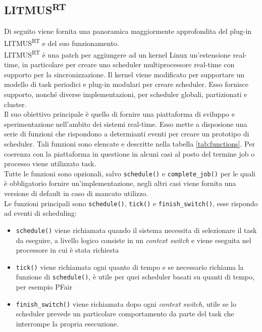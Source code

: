 \begin{appendices}

\section{LITMUS\textsuperscript{RT}}
\label{sec:litmus}

\noindent Di seguito viene fornita una panoramica maggiormente approfondita del plug-in LITMUS\textsuperscript{RT} e del suo funzionamento.\\

\noindent LITMUS\textsuperscript{RT} è una patch per aggiungere ad un kernel Linux un'estensione real-time, in particolare per creare uno scheduler multiprocessore real-time con supporto per la sincronizzazione. Il kernel viene modificato per supportare un modello di task periodici e plug-in modulari per creare scheduler. Esso fornisce supporto, nonché diverse implementazioni, per scheduler globali, partizionati e cluster.\\

\noindent Il suo obiettivo principale è quello di fornire una piattaforma di sviluppo e sperimentazione nell'ambito dei sistemi real-time. Esso mette a disposione una serie di funzioni che rispondono a determianti eventi per creare un prototipo di scheduler. Tali funzioni sono elencate e descritte nella tabella \ref{tab:functions}. Per coerenza con la piattaforma in questione in alcuni casi al posto del termine job o processo viene utilizzato task.\\

\noindent Tutte le funzioni sono opzionali, salvo \texttt{schedule()} e \texttt{complete\_job()} per le quali è obbligatorio fornire un'implementazione, negli altri casi viene fornita una versione di default in caso di mancato utilizzo.\\

\noindent Le funzioni principali sono \texttt{schedule()}, \texttt{tick()} e \texttt{finish\_switch()}, esse rispondo ad eventi di scheduling:\\

\begin{itemize}
	\item \texttt{schedule()} viene richiamata quando il sistema necessita di selezionare il task da eseguire, a livello logico consiste in un \textit{context switch} e viene eseguita nel processore in cui è stata richiesta
	\item \texttt{tick()} viene richiamata ogni quanto di tempo e se necessario richiama la funzione di \texttt{schedule()}, è utile per quei scheduler basati su quanti di tempo, per esempio PFair
	\item \texttt{finish\_switch()} viene richiamata dopo ogni \textit{context switch}, utile se lo scheduler prevede un particolare comportamento da parte del task che interrompe la propria esecuzione.\\
\end{itemize}


\end{appendices}
